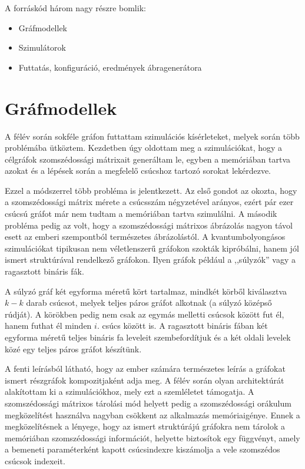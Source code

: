 A forráskód három nagy részre bomlik:
\begin{itemize}
  \item Gráfmodellek
  \item Szimulátorok
  \item Futtatás, konfiguráció, eredmények ábragenerátora
\end{itemize}

\section{Gráfmodellek}

A félév során sokféle gráfon futtattam szimulációs kísérleteket, melyek során több problémába ütköztem. Kezdetben úgy oldottam meg a szimulációkat, hogy a célgráfok szomszédossági mátrixait generáltam le, egyben a memóriában tartva azokat és a lépések során a megfelelő csúcshoz tartozó sorokat lekérdezve.

Ezzel a módszerrel több probléma is jelentkezett. Az első gondot az okozta, hogy a szomszédossági mátrix mérete a csúcsszám négyzetével arányos, ezért pár ezer csúcsú gráfot már nem tudtam a memóriában tartva szimulálni. A második probléma pedig az volt, hogy a szomszédossági mátrixos ábrázolás nagyon távol esett az emberi szempontból természetes ábrázolástól. A kvantumbolyongásos szimulációkat tipikusan nem véletlenszerű gráfokon szokták kipróbálni, hanem jól ismert struktúrával rendelkező gráfokon. Ilyen gráfok például a ,,súlyzók''
vagy a ragasztott bináris fák.

A súlyzó gráf két egyforma méretű kört tartalmaz, mindkét körből kiválasztva $k - k$ darab csúcsot, melyek teljes páros gráfot alkotnak (a súlyzó középső rúdját). A körökben pedig nem csak az egymás melletti csúcsok között fut él, hanem futhat él minden $i.$ csúcs között is. A ragasztott bináris fában két egyforma méretű teljes bináris fa leveleit szembefordítjuk és a két oldali levelek közé egy teljes páros gráfot készítünk.

A fenti leírásból látható, hogy az ember számára természetes leírás a gráfokat ismert részgráfok kompozitjaként adja meg. A félév során olyan architektúrát alakítottam ki a szimulációkhoz, mely ezt a szemléletet támogatja. A szomszédossági mátrixos tárolási mód helyett pedig a szomszédossági orákulum megközelítést használva nagyban csökkent az alkalmazás memóriaigénye. Ennek a megközelítésnek a lényege, hogy az ismert struktúrájú gráfokra nem tárolok a memóriában szomszédossági információt, helyette biztosítok egy függvényt, amely a bemeneti paraméterként kapott csúcsindexre kiszámolja a vele szomszédos csúcsok indexeit.

